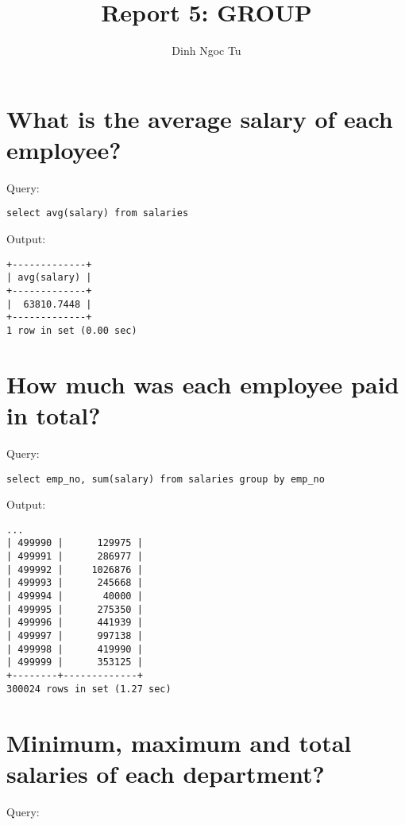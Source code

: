 \documentclass[12pt]{article}
\title{Report 5: GROUP}
\author{Dinh Ngoc Tu}
\begin{document}
\maketitle


\section{What is the average salary of each employee?}

Query:

\begin{verbatim}
select avg(salary) from salaries
\end{verbatim}

Output:

\begin{verbatim}
+-------------+
| avg(salary) |
+-------------+
|  63810.7448 |
+-------------+
1 row in set (0.00 sec)
\end{verbatim}


\section{How much was each employee paid in total?}

Query:

\begin{verbatim}
select emp_no, sum(salary) from salaries group by emp_no
\end{verbatim}

Output:

\begin{verbatim}
...
| 499990 |      129975 |
| 499991 |      286977 |
| 499992 |     1026876 |
| 499993 |      245668 |
| 499994 |       40000 |
| 499995 |      275350 |
| 499996 |      441939 |
| 499997 |      997138 |
| 499998 |      419990 |
| 499999 |      353125 |
+--------+-------------+
300024 rows in set (1.27 sec)
\end{verbatim}


\section{Minimum, maximum and total salaries of each department?}

Query:
\end{document}
